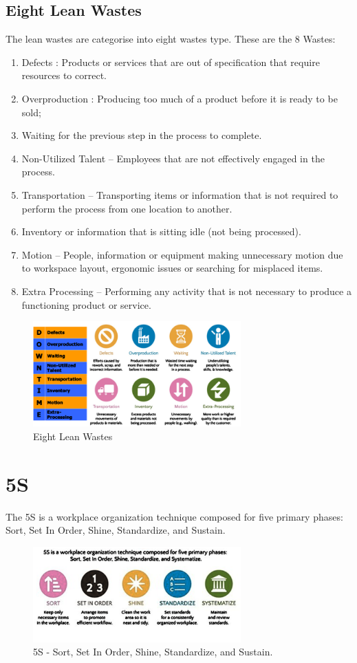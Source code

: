 \documentclass{sigplanconf}
\begin{document}
\subsection{Eight Lean Wastes}
The lean wastes are categorise into eight wastes type.
These are the 8 Wastes:
\begin{enumerate}
  \item Defects : Products or services that are out of specification that require resources to correct.
  \item Overproduction : Producing too much of a product before it is ready to be sold;
  \item Waiting for the previous step in the process to complete.
  \item Non-Utilized Talent – Employees that are not effectively engaged in the process.
  \item Transportation – Transporting items or information that is not required to perform the process from one location to another.
  \item Inventory or information that is sitting idle (not being processed).
  \item Motion – People, information or equipment making unnecessary motion due to workspace layout, ergonomic issues or  searching for misplaced items.
  \item Extra Processing – Performing any activity that is not necessary to produce a functioning product or service.
\end{enumerate}
\begin{figure}
  \centering
  \includegraphics[width=8cm]{lean8wastes}
  \caption{Eight Lean Wastes}
\end{figure}
\section{5S}

The 5S is a workplace organization technique composed for five primary phases: Sort, Set In Order, Shine, Standardize, and Sustain.

\begin{figure}
  \centering
  \includegraphics[width=8cm]{5s}
  \caption{5S - Sort, Set In Order, Shine, Standardize, and Sustain.}
\end{figure}
\end{document}
